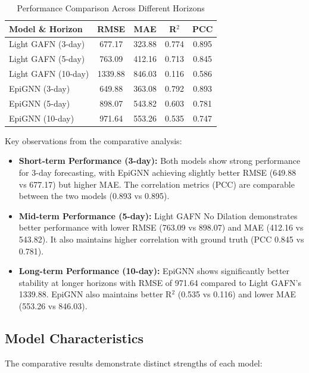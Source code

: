\documentclass[lettersize, journal]{IEEEtran}
\begin{document}
\begin{table}[h]
\centering
\caption{Performance Comparison Across Different Horizons}
\label{tab:metrics}
\begin{tabular}{lcccc}
\toprule
\textbf{Model \& Horizon} & \textbf{RMSE} & \textbf{MAE} & \textbf{R$^2$} & \textbf{PCC} \\
\midrule
Light GAFN (3-day) & 677.17 & 323.88 & 0.774 & 0.895 \\
Light GAFN (5-day) & 763.09 & 412.16 & 0.713 & 0.845 \\
Light GAFN (10-day) & 1339.88 & 846.03 & 0.116 & 0.586 \\
\midrule
EpiGNN (3-day) & 649.88 & 363.08 & 0.792 & 0.893 \\
EpiGNN (5-day) & 898.07 & 543.82 & 0.603 & 0.781 \\
EpiGNN (10-day) & 971.64 & 553.26 & 0.535 & 0.747 \\
\bottomrule
\end{tabular}
\end{table}

Key observations from the comparative analysis:

\begin{itemize}
    \item \textbf{Short-term Performance (3-day):} Both models show strong performance for 3-day forecasting, with EpiGNN achieving slightly better RMSE (649.88 vs 677.17) but higher MAE. The correlation metrics (PCC) are comparable between the two models (0.893 vs 0.895).
    
    \item \textbf{Mid-term Performance (5-day):} Light GAFN No Dilation demonstrates better performance with lower RMSE (763.09 vs 898.07) and MAE (412.16 vs 543.82). It also maintains higher correlation with ground truth (PCC 0.845 vs 0.781).
    
    \item \textbf{Long-term Performance (10-day):} EpiGNN shows significantly better stability at longer horizons with RMSE of 971.64 compared to Light GAFN's 1339.88. EpiGNN also maintains better R$^2$ (0.535 vs 0.116) and lower MAE (553.26 vs 846.03).
\end{itemize}

\subsection{Model Characteristics}
The comparative results demonstrate distinct strengths of each model:
\end{document}
